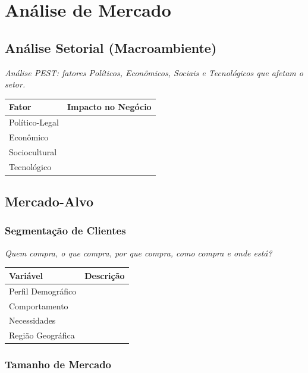 \documentclass[
	12pt,
	openright,
	oneside,
	a4paper,
	chapter=TITLE,
	section=TITLE,
	english,
	brazil
	]{abntex2}
\newcommand{\tcampo}[1]{%
	{#1}%
}
\newcommand{\instrucao}[1]{%
	\vspace{0.3cm}%
	\noindent%
	{%
		\setlength{\fboxsep}{6pt}%
		\colorbox{azul-claro}{%
			\begin{minipage}{\dimexpr\textwidth-2\fboxsep\relax}%
				\setlength{\parindent}{1.25cm}%
				{\color{cinza-instrucao}\small\itshape #1}%
			\end{minipage}%
		}%
	}%
	\vspace{0.3cm}%
}
\begin{document}
\chapter{Análise de Mercado}

\section{Análise Setorial (Macroambiente)}

\instrucao{Análise PEST: fatores Políticos, Econômicos, Sociais e Tecnológicos que afetam o setor.}

\centering
\begin{tabularx}{\textwidth}{X X}
\toprule
\rowcolor{azul-claro}
\textbf{Fator} & \textbf{Impacto no Negócio} \\
\midrule
Político-Legal  & \tcampo{} \\
Econômico       & \tcampo{} \\
Sociocultural   & \tcampo{} \\
Tecnológico     & \tcampo{} \\
\bottomrule
\end{tabularx}

\section{Mercado-Alvo}

\subsection{Segmentação de Clientes}

\instrucao{Quem compra, o que compra, por que compra, como compra e onde está?}

\centering
\begin{tabularx}{\textwidth}{X X}
\toprule
\rowcolor{azul-claro}
\textbf{Variável} & \textbf{Descrição} \\
\midrule
Perfil Demográfico  & \tcampo{} \\
Comportamento       & \tcampo{} \\
Necessidades        & \tcampo{} \\
Região Geográfica   & \tcampo{} \\
\bottomrule
\end{tabularx}

\subsection{Tamanho de Mercado}
\end{document}
